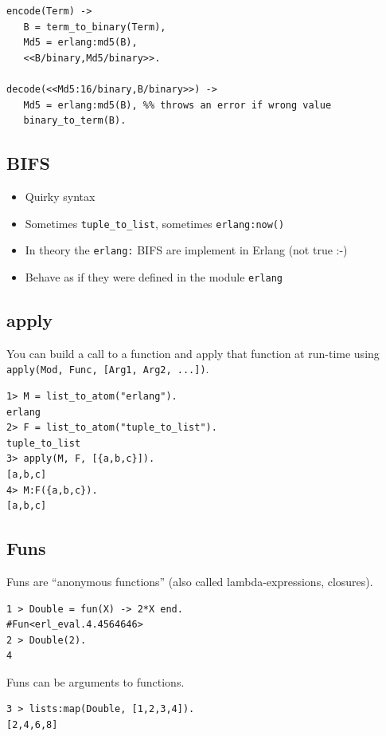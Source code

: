 \documentclass[12pt]{article}
\begin{document}
\begin{verbatim}
encode(Term) ->
   B = term_to_binary(Term),
   Md5 = erlang:md5(B),
   <<B/binary,Md5/binary>>.

decode(<<Md5:16/binary,B/binary>>) ->
   Md5 = erlang:md5(B), %% throws an error if wrong value
   binary_to_term(B).
\end{verbatim}

\subsection{BIFS}

\begin{itemize}
\item Quirky syntax
\item Sometimes \verb+tuple_to_list+, sometimes \verb+erlang:now()+
\item In theory the \verb+erlang:+ BIFS are implement in Erlang (not true :-)

\item Behave as if they were defined in the module \verb+erlang+
\end{itemize}

\subsection{apply}

You can build a call to a function and apply that function at run-time
using \verb+apply(Mod, Func, [Arg1, Arg2, ...])+.

\begin{verbatim}
1> M = list_to_atom("erlang").       
erlang
2> F = list_to_atom("tuple_to_list").
tuple_to_list
3> apply(M, F, [{a,b,c}]).           
[a,b,c]
4> M:F({a,b,c}).
[a,b,c]
\end{verbatim}

\subsection{Funs}

Funs are ``anonymous functions'' (also called lambda-expressions, closures).

\begin{verbatim}
1 > Double = fun(X) -> 2*X end.
#Fun<erl_eval.4.4564646>
2 > Double(2).
4
\end{verbatim}

Funs can be arguments to functions.

\begin{verbatim}
3 > lists:map(Double, [1,2,3,4]).
[2,4,6,8]
\end{verbatim}
\end{document}
